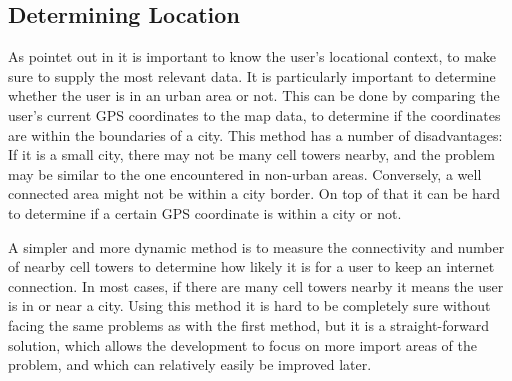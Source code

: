 \subsection{Determining Location}
As pointet out in  it is important to know the user's locational context, to make sure to supply the most relevant data. It is particularly important to determine whether the user is in an urban area or not. This can be done by comparing the user's current GPS coordinates to the map data, to determine if the coordinates are within the boundaries of a city. This method has a number of disadvantages: If it is a small city, there may not be many cell towers nearby, and the problem may be similar to the one encountered in non-urban areas. Conversely, a well connected area might not be within a city border. On top of that it can be hard to determine if a certain GPS coordinate is within a city or not.

A simpler and more dynamic method is to measure the connectivity and number of nearby cell towers to determine how likely it is for a user to keep an internet connection. In most cases, if there are many cell towers nearby it means the user is in or near a city. Using this method it is hard to be completely sure without facing the same problems as with the first method, but it is a straight-forward solution, which allows the development to focus on more import areas of the problem, and which can relatively easily be improved later.